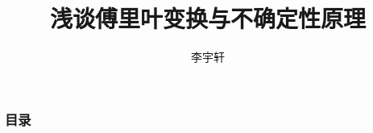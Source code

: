\documentclass[compress,aspectratio=169]{ctexbeamer}
\title{浅谈傅里叶变换与不确定性原理}
\author{李宇轩}
\begin{document}
\begin{frame}
    \titlepage
\end{frame}

\begin{frame}
    \frametitle{目录}
    \begin{multicols}{1}
        \tableofcontents[hideallsubsections]
    \end{multicols}
\end{frame}

\setlength{\parskip}{6pt}


\end{document}
